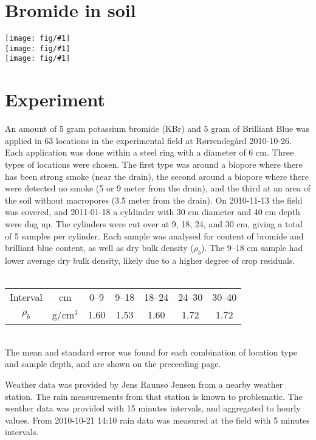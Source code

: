 \documentclass[a4paper]{article}
\newcommand{\fig}[1]{\texttt{[image: fig/\#1]}}
\begin{document}
\section*{Bromide in soil}

\noindent\fig{without}\\
\fig{macro}\\
\fig{drain}

\pagebreak{}
\section*{Experiment}

An amount of 5 gram potassium bromide (KBr) and 5 gram of Brilliant
Blue was applied in 63 locations in the experimental field at
Rørrendegård 2010-10-26.  Each application was done within a steel
ring with a diameter of 6 cm.  Three types of locations were chosen.
The first type was around a biopore where there has been strong smoke
(near the drain), the second around a biopore where there were
detected no smoke (5 or 9 meter from the drain), and the third at an
area of the soil without macropores (3.5 meter from the drain).  On
2010-11-13 the field was covered, and 2011-01-18 a cyldinder with 30
cm diameter and 40 cm depth were dug up. The cylinders were cut over
at 9, 18, 24, and 30 cm, giving a total of 5 samples per cylinder.
Each sample was analysed for content of bromide and brilliant blue
content, as well as dry bulk density ($\rho_b$).  The 9--18 cm sample
had lower average
dry bulk density, likely due to a higher degree of crop residuals.\\\\
\begin{tabular}{|c|c|ccccc|}\hline
  Interval & cm & 0--9 & 9--18 & 18--24 & 24--30 & 30--40\\
  $\rho_b$ & g/cm$^3$ & 1.60 & 1.53 & 1.60 & 1.72 & 1.72\\\hline
\end{tabular}\\

The mean and standard error was found for each combination of location
type and sample depth, and are shown on the preceeding page.

Weather data was provided by Jens Raunsø Jensen from a nearby weather
station.  The rain measurements from that station is known to
problematic.  The weather data was provided with 15 minutes intervals,
and aggregated to hourly values.  From 2010-10-21 14:10 rain data was
measured at the field with 5 minutes intervals.
\end{document}
